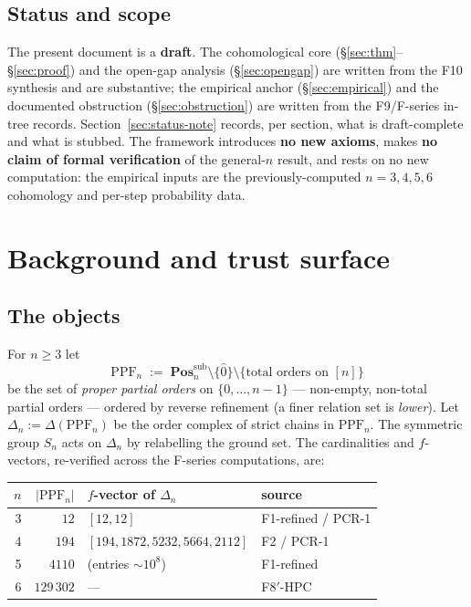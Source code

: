 \documentclass[11pt,reqno]{amsart}
\theoremstyle{plain}
\theoremstyle{definition}
\newcommand{\PPF}{\mathrm{PPF}}
\newcommand{\Pos}{\mathbf{Pos}}
\begin{document}
\subsection{Status and scope}
The present document is a \textbf{draft}. The cohomological core
(\S\ref{sec:thm}--\S\ref{sec:proof}) and the open-gap analysis
(\S\ref{sec:opengap}) are written from the F10 synthesis and are
substantive; the empirical anchor (\S\ref{sec:empirical}) and the
documented obstruction (\S\ref{sec:obstruction}) are written from the
F9/F-series in-tree records. Section~\ref{sec:status-note} records, per
section, what is draft-complete and what is stubbed. The framework
introduces \textbf{no new axioms}, makes \textbf{no claim of formal
verification} of the general-$n$ result, and rests on no new
computation: the empirical inputs are the previously-computed
$n=3,4,5,6$ cohomology and per-step probability data.

\section{Background and trust surface}\label{sec:background}

\subsection{The objects}\label{ssec:objects}
For $n\ge3$ let
\[
  \PPF_n\;:=\;\Pos_n^{\mathrm{sub}}\setminus\{\widehat0\}
            \setminus\{\text{total orders on }[n]\}
\]
be the set of \emph{proper partial orders} on $\{0,\dots,n-1\}$ ---
non-empty, non-total partial orders --- ordered by reverse refinement
(a finer relation set is \emph{lower}). Let $\Delta_n:=\Delta(\PPF_n)$
be the order complex of strict chains in $\PPF_n$. The symmetric group
$S_n$ acts on $\Delta_n$ by relabelling the ground set. The cardinalities
and $f$-vectors, re-verified across the F-series computations, are:
\begin{center}
\begin{tabular}{r r l l}
\toprule
$n$ & $|\PPF_n|$ & $f$-vector of $\Delta_n$ & source \\
\midrule
3 & $12$       & $[12,12]$ & F1-refined / PCR-1 \\
4 & $194$      & $[194,1872,5232,5664,2112]$ & F2 / PCR-1 \\
5 & $4110$     & (entries ${\sim}10^8$) & F1-refined \\
6 & $129\,302$ & --- & F8$'$-HPC \\
\bottomrule
\end{tabular}
\end{center}
\end{document}
